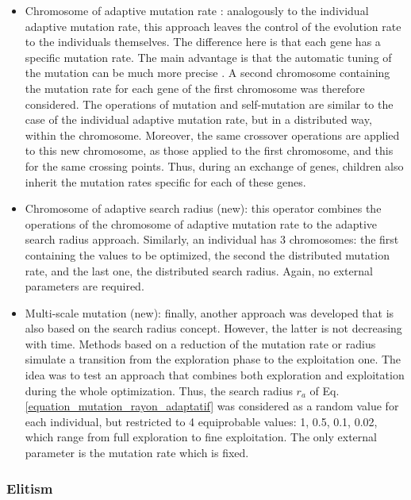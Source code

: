\documentclass{ametsoc}
\begin{document}
\begin{itemize}
	\item Chromosome of adaptive mutation rate \citep[or \textit{n adaptative mutation rate},][]{Back1992a}: analogously to the individual adaptive mutation rate, this approach leaves the control of the evolution rate to the individuals themselves. The difference here is that each gene has a specific mutation rate. The main advantage is that the automatic tuning of the mutation can be much more precise \citep{Smith1997a}. A second chromosome containing the mutation rate for each gene of the first chromosome was therefore considered. The operations of mutation and self-mutation are similar to the case of the individual adaptive mutation rate, but in a distributed way, within the chromosome. Moreover, the same crossover operations are applied to this new chromosome, as those applied to the first chromosome, and this for the same crossing points. Thus, during an exchange of genes, children also inherit the mutation rates specific for each of these genes.
	
	\item Chromosome of adaptive search radius (new): this operator combines the operations of the chromosome of adaptive mutation rate to the adaptive search radius approach. Similarly, an individual has 3 chromosomes: the first containing the values to be optimized, the second the distributed mutation rate, and the last one, the distributed search radius. Again, no external parameters are required.
	
	\item Multi-scale mutation (new): finally, another approach was developed that is also based on the search radius concept. However, the latter is not decreasing with time. Methods based on a reduction of the mutation rate or radius simulate a transition from the exploration phase to the exploitation one. The idea was to test an approach that combines both exploration and exploitation during the whole optimization. Thus, the search radius $r_{a}$ of Eq. \ref{equation_mutation_rayon_adaptatif} was considered as a random value for each individual, but restricted to 4 equiprobable values: 1, 0.5, 0.1, 0.02, which range from full exploration to fine exploitation. The only external parameter is the mutation rate which is fixed.
	
\end{itemize}


\subsubsection{Elitism}
\end{document}
